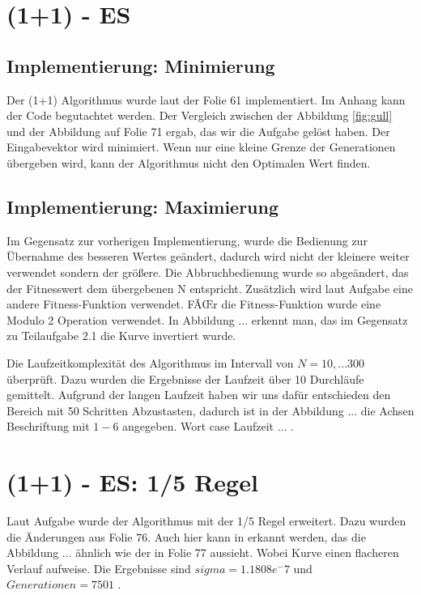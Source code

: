 \chapter{(1+1) - ES}

\section{Implementierung: Minimierung}

Der (1+1) Algorithmus wurde laut der Folie 61 implementiert. Im Anhang kann der Code begutachtet werden. Der Vergleich zwischen der Abbildung \ref{fig:gull} und der Abbildung auf Folie 71 ergab, das wir die Aufgabe gelöst haben. Der Eingabevektor wird minimiert. Wenn nur eine kleine Grenze der Generationen übergeben wird, kann der Algorithmus nicht den Optimalen Wert finden.


\section{Implementierung: Maximierung}

Im Gegensatz zur vorherigen Implementierung, wurde die Bedienung zur Übernahme des besseren Wertes geändert, dadurch wird nicht der kleinere weiter verwendet sondern der größere. Die Abbruchbedienung wurde so abgeändert, das der Fitnesswert dem übergebenen N entspricht. Zusätzlich wird laut Aufgabe eine andere Fitness-Funktion verwendet. FÃŒr die Fitness-Funktion wurde eine Modulo 2 Operation verwendet. In Abbildung  ... erkennt man, das im Gegensatz zu Teilaufgabe 2.1 die Kurve invertiert wurde.


Die Laufzeitkomplexität des Algorithmus im Intervall von $N=10,...300$ überprüft. Dazu wurden die Ergebnisse der Laufzeit über 10 Durchläufe gemittelt. Aufgrund der langen Laufzeit haben wir uns dafür entschieden den Bereich mit 50 Schritten Abzustasten, dadurch ist in der Abbildung  ... die Achsen Beschriftung mit $1-6$ angegeben. Wort case Laufzeit  ... .


\chapter{(1+1) - ES: 1/5 Regel}

Laut Aufgabe wurde der Algorithmus mit der 1/5 Regel erweitert. Dazu wurden die Änderungen aus Folie 76. Auch hier kann in erkannt werden, das die Abbildung  ... ähnlich wie der in Folie 77 aussieht. Wobei Kurve einen flacheren Verlauf aufweise. Die Ergebnisse sind $sigma = 1.1808e^-7$ und $Generationen = 7501$ .


